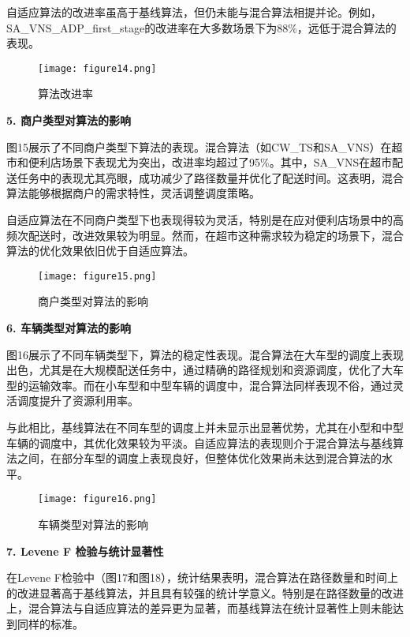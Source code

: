 \documentclass[12pt,a4paper,twoside]{ctexbook}
\begin{document}
自适应算法的改进率虽高于基线算法，但仍未能与混合算法相提并论。例如，SA\_VNS\_ADP\_first\_stage的改进率在大多数场景下为88\%，远低于混合算法的表现。

\begin{figure}[H]
    \centering
    \texttt{[image: figure14.png]} %
    \caption{算法改进率}
    \label{fig:improvement_rates}
\end{figure}

\textbf{5. 商户类型对算法的影响}

图15展示了不同商户类型下算法的表现。混合算法（如CW\_TS和SA\_VNS）在超市和便利店场景下表现尤为突出，改进率均超过了95\%。其中，SA\_VNS在超市配送任务中的表现尤其亮眼，成功减少了路径数量并优化了配送时间。这表明，混合算法能够根据商户的需求特性，灵活调整调度策略。

自适应算法在不同商户类型下也表现得较为灵活，特别是在应对便利店场景中的高频次配送时，改进效果较为明显。然而，在超市这种需求较为稳定的场景下，混合算法的优化效果依旧优于自适应算法。

\begin{figure}[H]
    \centering
    \texttt{[image: figure15.png]} %
    \caption{商户类型对算法的影响}
    \label{fig:merchant_type_impact}
\end{figure}

\textbf{6. 车辆类型对算法的影响}

图16展示了不同车辆类型下，算法的稳定性表现。混合算法在大车型的调度上表现出色，尤其是在大规模配送任务中，通过精确的路径规划和资源调度，优化了大车型的运输效率。而在小车型和中型车辆的调度中，混合算法同样表现不俗，通过灵活调度提升了资源利用率。

与此相比，基线算法在不同车型的调度上并未显示出显著优势，尤其在小型和中型车辆的调度中，其优化效果较为平淡。自适应算法的表现则介于混合算法与基线算法之间，在部分车型的调度上表现良好，但整体优化效果尚未达到混合算法的水平。

\begin{figure}[H]
    \centering
    \texttt{[image: figure16.png]} %
    \caption{车辆类型对算法的影响}
    \label{fig:vehicle_type_impact}
\end{figure}

\textbf{7. Levene F 检验与统计显著性}

在Levene F检验中（图17和图18），统计结果表明，混合算法在路径数量和时间上的改进显著高于基线算法，并且具有较强的统计学意义。特别是在路径数量的改进上，混合算法与自适应算法的差异更为显著，而基线算法在统计显著性上则未能达到同样的标准。
\end{document}

